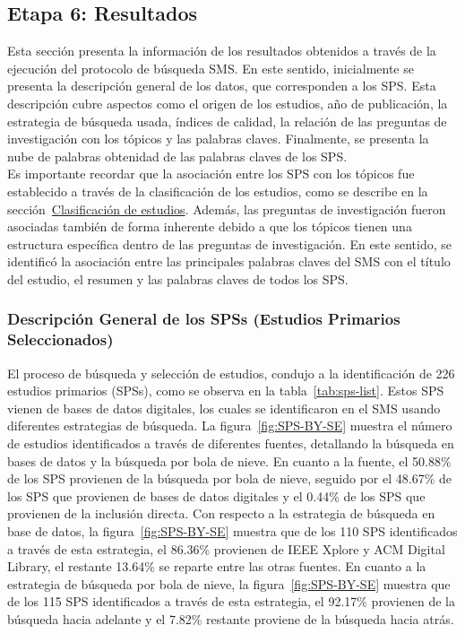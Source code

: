 \subsection{Etapa 6: Resultados}
Esta sección presenta la información de los resultados obtenidos a través de la ejecución del protocolo de búsqueda SMS. En este sentido, inicialmente se presenta la descripción general de los datos, que corresponden a los SPS. Esta descripción cubre aspectos como el origen de los estudios, año de publicación, la estrategia de búsqueda usada, índices de calidad, la relación de las preguntas de investigación con los tópicos y las palabras claves. Finalmente, se presenta la nube de palabras obtenidad de las palabras claves de los SPS. \\
Es importante recordar que la asociación entre los SPS con los tópicos fue establecido a través de la clasificación de los estudios, como se describe en la sección~\hyperref[sec:clasificacion-estudios]{Clasificación de estudios}. Además, las preguntas de investigación fueron asociadas también de forma inherente debido a que los tópicos tienen una estructura específica dentro de las preguntas de investigación. En este sentido, se identificó la asociación entre las principales palabras claves del SMS con el título del estudio, el resumen y las palabras claves de todos los SPS.
\mbox{}\\

\subsubsection{Descripción General de los SPSs (Estudios Primarios Seleccionados)}
El proceso de búsqueda y selección de estudios, condujo a la identificación de 226 estudios primarios (SPSs), como se observa en la tabla~\ref{tab:sps-list}.
Estos SPS vienen de bases de datos digitales, los cuales se identificaron en el SMS usando diferentes estrategias de búsqueda. La figura~\ref{fig:SPS-BY-SE} muestra el número de estudios identificados a través de diferentes fuentes, detallando la búsqueda en bases de datos y la búsqueda por bola de nieve. En cuanto a la fuente, el 50.88\% de los SPS provienen de la búsqueda por bola de nieve, seguido por el 48.67\% de los SPS que provienen de bases de datos digitales y el 0.44\% de los SPS que provienen de la inclusión directa.
Con respecto a la estrategia de búsqueda en base de datos, la figura~\ref{fig:SPS-BY-SE} muestra que de los 110 SPS identificados a través de esta estrategia, el 86.36\% provienen de IEEE Xplore y ACM Digital Library, el restante 13.64\% se reparte entre las otras fuentes.
En cuanto a la estrategia de búsqueda por bola de nieve, la figura~\ref{fig:SPS-BY-SE} muestra que de los 115 SPS identificados a través de esta estrategia, el 92.17\% provienen de la búsqueda hacia adelante y el 7.82\% restante proviene de la búsqueda hacia atrás.


